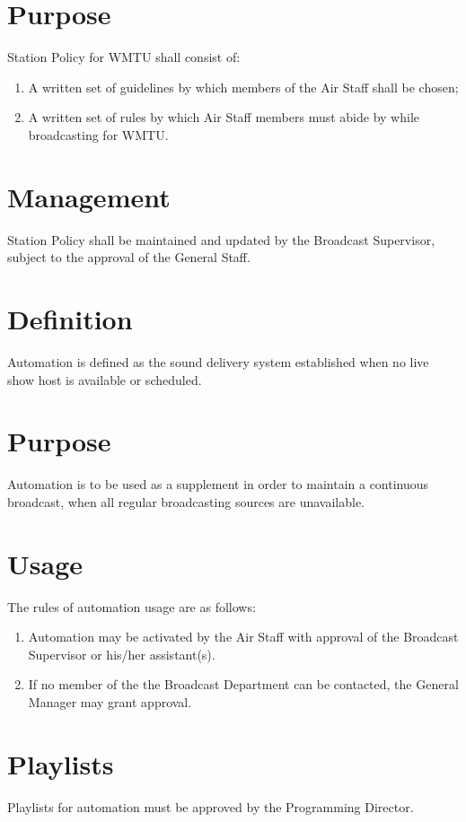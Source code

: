 \documentclass[12pt]{constitution}
\begin{document}


\section{Purpose}
Station Policy for WMTU shall consist of:
\begin{enumerate}
\item A written set of guidelines by which members of the Air Staff shall be chosen;
\item A written set of rules by which Air Staff members must abide by while broadcasting for WMTU.
\end{enumerate}


\section{Management}
Station Policy shall be maintained and updated by the Broadcast Supervisor, subject to the approval of the General Staff.




\section{Definition}
Automation is defined as the sound delivery system established when no live show host is available or scheduled.


\section{Purpose}
Automation is to be used as a supplement in order to maintain a continuous broadcast, when all regular broadcasting sources are unavailable.


\section{Usage}
The rules of automation usage are as follows:
\begin{enumerate}
\item Automation may be activated by the Air Staff with approval of the Broadcast Supervisor or his/her assistant(s).
\item If no member of the the Broadcast Department can be contacted, the General Manager may grant approval.
\end{enumerate}


\section{Playlists}
Playlists for automation must be approved by the Programming Director.
\end{document}
